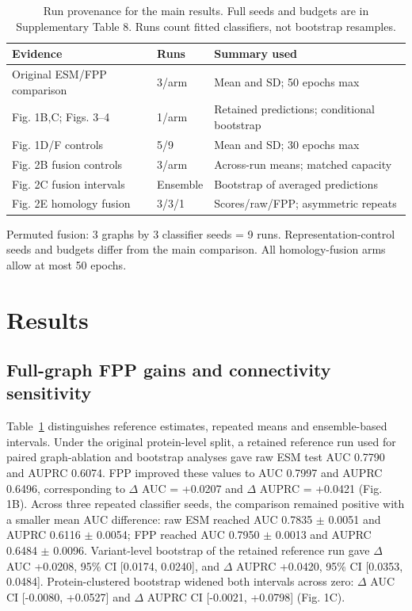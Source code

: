 \documentclass[conference]{IEEEtran}
\begin{document}
\begin{table}[t]
\caption{Run provenance for the main results. Full seeds and budgets are in Supplementary Table 8. Runs count fitted classifiers, not bootstrap resamples.}
\label{tab:run_sources}
\centering
\footnotesize
\setlength{\tabcolsep}{3pt}
\renewcommand{\arraystretch}{1.12}
\begin{tabular}{p{}p{}p{}}
\hline
Evidence & Runs & Summary used \\
\hline
Original ESM/FPP comparison & 3/arm & Mean and SD; 50 epochs max \\
Fig. 1B,C; Figs. 3--4 & 1/arm & Retained predictions; conditional bootstrap \\
Fig. 1D/F controls & 5/9 & Mean and SD; 30 epochs max \\
Fig. 2B fusion controls & 3/arm & Across-run means; matched capacity \\
Fig. 2C fusion intervals & Ensemble & Bootstrap of averaged predictions \\
Fig. 2E homology fusion & 3/3/1 & Scores/raw/FPP; asymmetric repeats \\
\hline
\end{tabular}
\par\smallskip
\raggedright Permuted fusion: 3 graphs by 3 classifier seeds = 9 runs. Representation-control seeds and budgets differ from the main comparison. All homology-fusion arms allow at most 50 epochs.
\end{table}

\section{Results}

\subsection{Full-graph FPP gains and connectivity sensitivity}

Table~\ref{tab:run_sources} distinguishes reference estimates, repeated means and ensemble-based intervals. Under the original protein-level split, a retained reference run used for paired graph-ablation and bootstrap analyses gave raw ESM test AUC 0.7790 and AUPRC 0.6074. FPP improved these values to AUC 0.7997 and AUPRC 0.6496, corresponding to $\Delta$ AUC = +0.0207 and $\Delta$ AUPRC = +0.0421 (Fig. 1B). Across three repeated classifier seeds, the comparison remained positive with a smaller mean AUC difference: raw ESM reached AUC 0.7835 $\pm$ 0.0051 and AUPRC 0.6116 $\pm$ 0.0054; FPP reached AUC 0.7950 $\pm$ 0.0013 and AUPRC 0.6484 $\pm$ 0.0096. Variant-level bootstrap of the retained reference run gave $\Delta$ AUC +0.0208, 95\% CI [0.0174, 0.0240], and $\Delta$ AUPRC +0.0420, 95\% CI [0.0353, 0.0484]. Protein-clustered bootstrap widened both intervals across zero: $\Delta$ AUC CI [-0.0080, +0.0527] and $\Delta$ AUPRC CI [-0.0021, +0.0798] (Fig. 1C).
\end{document}
